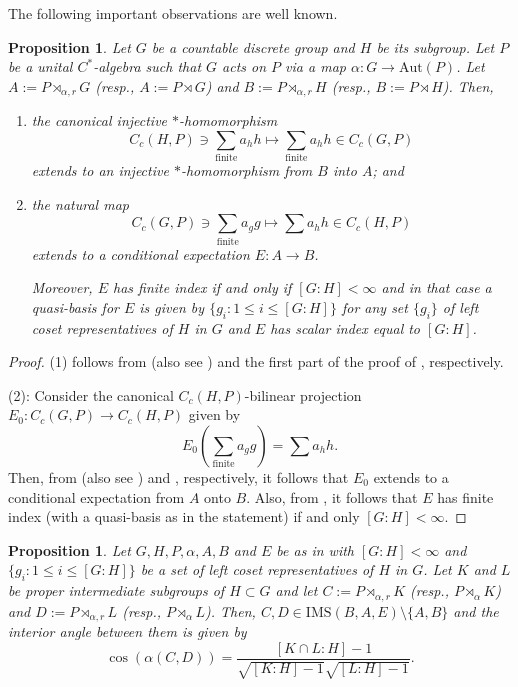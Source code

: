 \documentclass[a4]{amsart}
\newtheorem{proposition}[theorem]{\bf Proposition}
\numberwithin{equation}{section}
\begin{document}
The following important observations are well known.
\begin{proposition}\cite{cho,MK}\label{ch-cg-basics}
          Let $G$ be a countable discrete group and $H$ be its
          subgroup.  Let $P$ be a unital
          $C^*$-algebra such that $G$ acts on $P$ via a map $\alpha: G
          \to \mathrm{Aut}(P)$.  Let $A:=P \rtimes_{\alpha, r} G$
          (resp., $A:= P\rtimes G$) and $B:= P \rtimes_{\alpha, r} H$
          (resp., $B:= P\rtimes H$). Then,
 \begin{enumerate}
 \item  the canonical injective $*$-homomorphism
   \[
C_c(H, P)\ni \sum_{\mathrm{finite}} a_h h \mapsto \sum_{\mathrm{finite}} a_h h \in  C_c(G, P)
\]
extends to an injective $*$-homomorphism from $B$ into $A$; and
\item the natural map
  \[
C_c (G, P) \ni \sum_{\mathrm{finite}} a_g g \mapsto \sum a_h h \in C_c(H, P)
  \]
  extends to a conditional expectation $E: A \to B$.

  Moreover, $E$ has finite index if and only if $[G:H]< \infty$ and in that case a 
 quasi-basis for $E$ is given by $\{g_i : 1 \leq i \leq [G:H]\}$ for any  set $\{g_i\}$ of left coset
 representatives of $H$ in $G$ and $E$ has scalar index equal to $[G:H]$.
 \end{enumerate}
\end{proposition}
    \begin{proof}
    	(1) follows from \cite{cho} (also see \cite[Remark 3.2]{MK}) and the first part of the proof
      of \cite[Proposition 3.1]{MK}, respectively.\smallskip

      (2): Consider the canonical $C_c(H,P)$-bilinear projection $ E_0 : C_c(G,P)\to C_c(H,P) $ given by
        \[
        	E_0 \left(\sum_{\text{finite}} a_g g\right) = \sum a_h h .
       \]
Then, from \cite{cho} (also see \cite[Remark 3.2]{MK}) and
\cite[Proposition 3.1, Remark 3.2]{MK}, respectively, it follows that $E_0$ extends
to a conditional expectation from $A$ onto $B$. Also, from
\cite[Theorem 3.4]{MK}, it follows that $E$ has finite index (with a
quasi-basis as in the statement) if and only $[G:H] < \infty$.    \end{proof}

        \begin{proposition}\label{cross-prod-angle}
 Let $G, H, P, \alpha, A, B$ and $E$ be as in  with
 $[G:H] < \infty$ and $\{ g_i: 1 \leq i \leq [G:H]\}$ be a set of left
 coset representatives of $H$ in $G$. Let $K$ and $L$ be proper intermediate
 subgroups of $H \subset G$ and let $C:=P
 \rtimes_{\alpha, r} K$ (resp., $ P \rtimes_\alpha K$) and $D:=P
 \rtimes_{\alpha, r} L$ (resp., $P \rtimes_\alpha L$). Then, $C, D \in
 \mathrm{IMS}(B, A, E)\setminus\{A,B\}$ and the interior angle between them is given by
  \[
\cos(\alpha(C,D)) = \frac{[K\cap L: H] - 1}{\sqrt{[K:H]-1}\sqrt{[L:H]-1}}.
\]
        \end{proposition}
\end{document}
